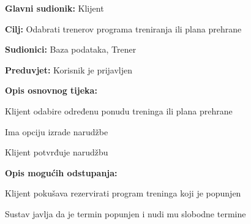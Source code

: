 				\noindent {}
					\begin{packed_item}
	
						\item \textbf{Glavni sudionik: } Klijent
						\item  \textbf{Cilj:} Odabrati trenerov programa treniranja ili plana prehrane
						\item  \textbf{Sudionici:} Baza podataka, Trener
						\item  \textbf{Preduvjet:} Korisnik je prijavljen
						\item  \textbf{Opis osnovnog tijeka:}
						
						\item[] \begin{packed_enum}
	
							\item Klijent odabire određenu ponudu treninga ili plana prehrane
							\item Ima opciju izrade narudžbe
							\item Klijent potvrđuje narudžbu
						\end{packed_enum}
						
						\item  \textbf{Opis mogućih odstupanja:}
						
						\item[] \begin{packed_item}
	
							\item[-] Klijent pokušava rezervirati program treninga koji je popunjen
							\item[] \begin{packed_enum}
								
								\item Sustav javlja da je termin popunjen i nudi mu slobodne termine
								
							\end{packed_enum}
							
						\end{packed_item}
					\end{packed_item}
					
